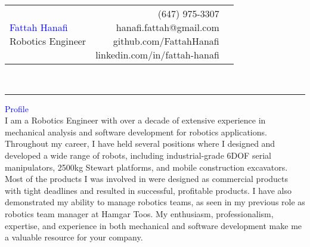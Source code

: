 \documentclass{letter}
\newcommand{\firstlastname}[1]{\noindent\textcolor{Blue}{\Huge{#1}}}
\newcommand{\subtitle}[1]{\noindent\textcolor{NavyBlue}{\Large{#1}}}
\newcommand{\header}[1]{\noindent\textcolor{Blue}{\Large{#1}}\\}
\begin{document}
\begin{tabularx}{0.9\textwidth}{X r l}
	\makecell[l]{\firstlastname{Fattah Hanafi} \\\subtitle{Robotics Engineer}} & \makecell[r]{(647) 975-3307\\hanafi.fattah@gmail.com\\github.com/FattahHanafi\\linkedin.com/in/fattah-hanafi} & \makecell[c]{\faPhone\\\faEnvelopeO\\\faGithub\\\faLinkedin}
\end{tabularx}\\
\noindent\rule{\textwidth}{0.4pt}

\header{Profile}
\indent\small{I am a Robotics Engineer with over a decade of extensive experience in mechanical analysis and software development for robotics applications. Throughout my career, I have held several positions where I designed and developed a wide range of robots, including industrial-grade 6DOF serial manipulators, 2500kg Stewart platforms, and mobile construction excavators. Most of the products I was involved in were designed as commercial products with tight deadlines and resulted in successful, profitable products. I have also demonstrated my ability to manage robotics teams, as seen in my previous role as robotics team manager at Hamgar Toos. My enthusiasm, professionalism, expertise, and experience in both mechanical and software development make me a valuable resource for your company.}
\end{document}
